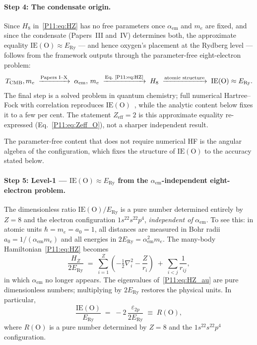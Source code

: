 \documentclass[11pt,a4paper]{article}
\theoremstyle{definition}
\theoremstyle{remark}
\newcommand{\TCMB}{T_{\mathrm{CMB}}}
\newcommand{\ERy}{E_{\mathrm{Ry}}}
\newcommand{\aem}{\alpha_{\mathrm{em}}}
\newcommand{\IE}{\mathrm{IE}}
\begin{document}
\paragraph{Step 4: The condensate origin.}
Since $H_8$ in~\eqref{P11:eq:HZ} has no free parameters once $\aem$ and
$m_e$ are fixed, and since the condensate (Papers~III and~IV)
determines both, the approximate equality $\IE(\mathrm{O})\approx\ERy$
--- and hence oxygen's placement at the Rydberg level --- follows from
the framework outputs through the parameter-free eight-electron
problem:
\[
  \TCMB, m_e
  \;\xrightarrow{\text{Papers I--X}}\;
  \aem,\, m_e
  \;\xrightarrow{\text{Eq.~\eqref{P11:eq:HZ}}}\;
  H_8
  \;\xrightarrow{\text{atomic structure}}\;
  \IE(\mathrm{O}) \approx \ERy .
\]
The final step is a solved problem in quantum chemistry; full
numerical Hartree--Fock with correlation reproduces
$\IE(\mathrm{O})$~\cite{Clementi1963}, while the analytic content
below fixes it to a few per cent.  The statement $Z_\mathrm{eff}=2$ is
this approximate equality re-expressed
(Eq.~\eqref{P11:eq:Zeff_O}), not a sharper independent result.

The parameter-free content that does not require numerical HF is the
angular algebra of the configuration, which fixes the structure of
$\IE(\mathrm{O})$ to the accuracy stated below.

\paragraph{Step 5: Level-1 --- $\IE(\mathrm{O})\approx\ERy$ from the
$\aem$-independent eight-electron problem.}

The dimensionless ratio $\IE(\mathrm{O})/\ERy$ is a pure number determined
entirely by $Z=8$ and the electron configuration $1s^22s^22p^4$,
\emph{independent of} $\aem$.
To see this: in atomic units $\hbar=m_e=a_0=1$, all distances are
measured in Bohr radii $a_0 = 1/(\aem m_e)$ and all energies in
$2\ERy = \aem^2 m_e$.
The many-body Hamiltonian~\eqref{P11:eq:HZ} becomes
\begin{equation}
  \frac{H_Z}{2\ERy}
  \;=\; \sum_{i=1}^Z
        \!\left(-\tfrac{1}{2}\nabla_i^2 - \frac{Z}{r_i}\right)
  \;+\; \sum_{i<j}\frac{1}{r_{ij}},
  \label{P11:eq:HZ_au}
\end{equation}
in which $\aem$ no longer appears.
The eigenvalues of~\eqref{P11:eq:HZ_au} are pure dimensionless numbers;
multiplying by $2\ERy$ restores the physical units.
In particular,
\begin{equation}
  \frac{\IE(\mathrm{O})}{\ERy}
  \;=\; -2\,\frac{\varepsilon_{2p}}{2\ERy}
  \;\equiv\; R(\text{O}),
  \label{P11:eq:R_O}
\end{equation}
where $R(\mathrm{O})$ is a pure number determined by $Z=8$ and the
$1s^22s^22p^4$ configuration.
\end{document}
